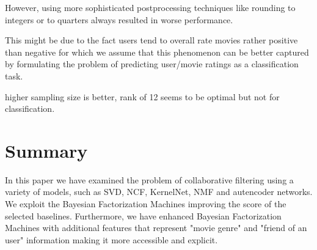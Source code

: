 \documentclass[10pt,conference,compsocconf]{IEEEtran}
\begin{document}
    However, using more sophisticated postprocessing techniques like rounding to integers or to quarters always resulted in worse performance.

    This might be due to the fact users tend to overall rate movies rather positive than negative for which we assume that this phenomenon can be better captured by formulating the problem of predicting user/movie ratings as a classification task.


    higher sampling size is better, rank of 12 seems to be optimal but not for classification.


    \section{Summary}

    In this paper we have examined the problem of collaborative filtering using a variety of models, such as SVD, NCF, KernelNet, NMF and autencoder networks. We exploit the Bayesian Factorization Machines improving the score of the selected baselines. Furthermore, we have enhanced Bayesian Factorization Machines with additional features that represent "movie genre" and "friend of an user" information making it more accessible and explicit.



    \balance
    
    
\end{document}
